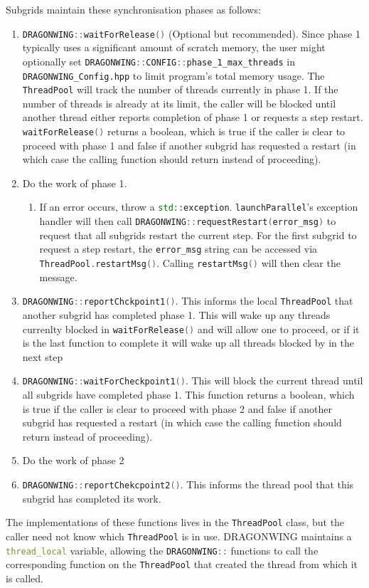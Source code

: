 \documentclass[11pt]{report}
\newcommand{\cpp}[1]{\lstinline[language=C++]{#1}}
\newcommand{\bash}[1]{\lstinline[language=bash]{#1}}
\begin{document}
Subgrids maintain these synchronisation phases as follows:
\begin{enumerate}
\item  \cpp{DRAGONWING::waitForRelease()} (Optional but recommended).  Since phase 1 typically uses a significant amount of scratch memory,  the user might optionally set  \cpp{DRAGONWING::CONFIG::phase_1_max_threads} in \bash{DRAGONWING_Config.hpp} to limit program's total memory usage. The \cpp{ThreadPool} will track the number of threads currently in phase 1. If the number of threads is already at its limit, the caller will be blocked until another thread either reports completion of phase 1 or requests a step restart. \cpp{waitForRelease()} returns a boolean, which is true if the caller is clear to proceed with phase 1 and false if another subgrid has requested a restart (in which case the calling function should return instead of proceeding).
\item Do the work of phase 1.
\begin{enumerate}
\item If an error occurs, throw a \cpp{std::exception}. \cpp{launchParallel}'s exception handler will then call \cpp{DRAGONWING::requestRestart(error_msg)} to request that all subgrids restart the current step. For the first subgrid to request a step restart, the \cpp{error_msg} string can be accessed via \cpp{ThreadPool.restartMsg()}. Calling \cpp{restartMsg()} will then clear the message.
\end{enumerate}
\item \cpp{DRAGONWING::reportChckpoint1()}. This informs the local \cpp{ThreadPool} that another subgrid has completed phase 1. This will wake up any threads currenlty blocked in \cpp{waitForRelease()} and will allow one to proceed, or if it is the last function to complete it will wake up all threads blocked by in  the next step
\item \cpp{DRAGONWING::waitForCheckpoint1()}. This will block the current thread until all subgrids have completed phase 1. This function returns a boolean, which is true if the caller is clear to proceed with phase 2 and false if another subgrid has requested a restart (in which case the calling function should return instead of proceeding).
\item Do the work of phase 2
\item \cpp{DRAGONWING::reportChekcpoint2()}. This informs the thread pool that this subgrid has completed its work.
\end{enumerate}
The implementations of these functions lives in the \cpp{ThreadPool} class, but the caller need not know which \cpp{ThreadPool} is in use. DRAGONWING maintains a \cpp{thread_local} variable, allowing the \cpp{DRAGONWING::} functions to call the corresponding function on the \cpp{ThreadPool} that created the thread from which it is called.
\end{document}
